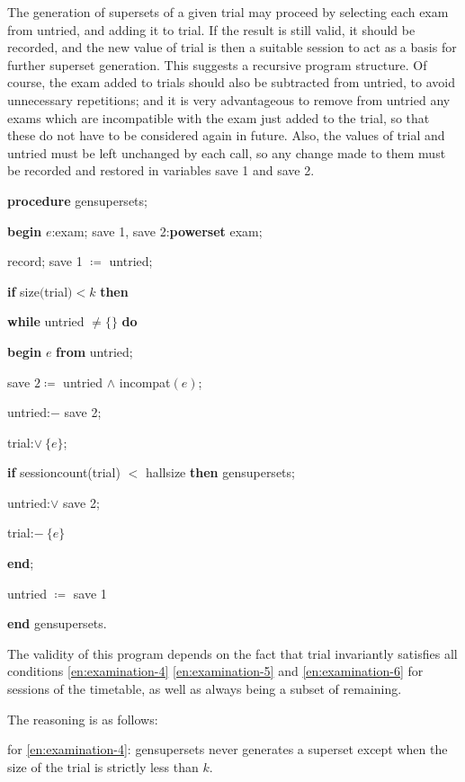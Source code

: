 \documentclass[twoside,11pt]{book}
\begin{document}
The generation of supersets of a given trial may proceed by selecting each exam from untried, and adding it to trial. If the result is still valid, it should be recorded, and the new value of trial is then a suitable session to act as a basis for further superset generation. This suggests a recursive program structure. Of course, the exam added to trials should also be subtracted from untried, to avoid unnecessary repetitions; and it is very advantageous to remove from untried any exams which are incompatible with the exam just added to the trial, so that these do not have to be considered again in future. Also, the values of trial and untried must be left unchanged by each call, so any change made to them must be recorded and restored in variables save 1 and save 2.

\textbf{procedure} gensupersets;

\quad \textbf{begin} $e$:exam; save 1, save 2:\textbf{powerset} exam;

\quad \quad record; save 1 $\coloneq$ untried;

\quad \quad \textbf{if} size$($trial$) < k$ \textbf{then}

\quad \quad \textbf{while} untried $\neq \{\}$ \textbf{do}

\quad \quad \quad \textbf{begin} $e$ \textbf{from} untried;

\quad \quad \quad \quad save $2\coloneq$ untried $\wedge$ incompat$(e)$;

\quad \quad \quad \quad untried:$-$ save 2;

\quad \quad \quad \quad trial:$\vee\ \{e\}$;

\quad \quad \quad \quad \textbf{if} sessioncount(trial) $<$ hallsize \textbf{then} gensupersets;

\quad \quad \quad \quad untried:$\vee$ save 2;

\quad \quad \quad \quad trial:$-\ \{e\}$

\quad \quad \quad \textbf{end};

\quad \quad \quad untried $\coloneq$ save 1

\quad \textbf{end} gensupersets.

The validity of this program depends on the fact that trial invariantly satisfies all conditions \ref{en:examination-4} \ref{en:examination-5} and \ref{en:examination-6} for sessions of the timetable, as well as always being a subset of remaining.

The reasoning is as follows:

for \ref{en:examination-4}: gensupersets never generates a superset except when the size of the trial is strictly less than $k$.
\end{document}

